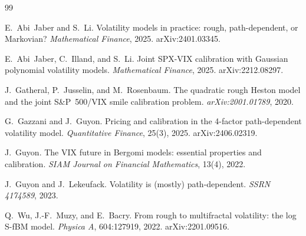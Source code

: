 \documentclass[11pt]{article}
\begin{document}

\begin{thebibliography}{99}

E.~Abi~Jaber and S.~Li.
\newblock Volatility models in practice: rough, path-dependent, or Markovian?
\newblock \emph{Mathematical Finance}, 2025. arXiv:2401.03345.

E.~Abi~Jaber, C.~Illand, and S.~Li.
\newblock Joint SPX-VIX calibration with Gaussian polynomial volatility models.
\newblock \emph{Mathematical Finance}, 2025. arXiv:2212.08297.

J.~Gatheral, P.~Jusselin, and M.~Rosenbaum.
\newblock The quadratic rough Heston model and the joint S\&P~500/VIX smile calibration problem.
\newblock \emph{arXiv:2001.01789}, 2020.

G.~Gazzani and J.~Guyon.
\newblock Pricing and calibration in the 4-factor path-dependent volatility model.
\newblock \emph{Quantitative Finance}, 25(3), 2025. arXiv:2406.02319.

J.~Guyon.
\newblock The VIX future in Bergomi models: essential properties and calibration.
\newblock \emph{SIAM Journal on Financial Mathematics}, 13(4), 2022.

J.~Guyon and J.~Lekeufack.
\newblock Volatility is (mostly) path-dependent.
\newblock \emph{SSRN 4174589}, 2023.

Q.~Wu, J.-F.~Muzy, and E.~Bacry.
\newblock From rough to multifractal volatility: the log S-fBM model.
\newblock \emph{Physica A}, 604:127919, 2022. arXiv:2201.09516.

\end{thebibliography}
\end{document}
